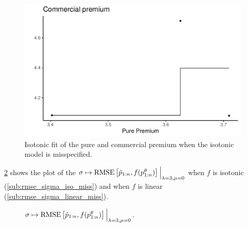 \documentclass[10pt]{article}
\begin{document}
\begin{figure}[!ht]
  \begin{center}
  \includegraphics[width=0.7\linewidth]{../figures/pp_cp_miss_specified}
    \caption{Isotonic fit of the pure and commercial premium when the isotonic model is misspecified.}
    \label{fig:pp_cp_miss_specified}
  \end{center}
\end{figure}

\cref{fig:rmse_sigma_iso_linear_miss} shows the plot of the $\sigma\mapsto  \text{RMSE}\left[\Tilde{p}_{1:n}, f(p_{1:n}^\theta)\right]\Big\rvert_{\lambda =3, \mu =0}$ when $f$ is isotonic (\cref{sub:rmse_sigma_iso_miss}) and when $f$ is linear (\cref{sub:rmse_sigma_linear_miss}).

\begin{figure}[!ht]
  \begin{center}
    \caption{$\sigma\mapsto  \text{RMSE}\left[\Tilde{p}_{1:n}, f(p_{1:n}^\theta)\right]\Big\rvert_{\lambda =3, \mu =0}$.}
    \label{fig:rmse_sigma_iso_linear_miss}
  \end{center}
\end{figure}
\end{document}
